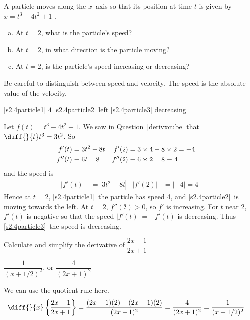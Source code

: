 \begin{Mquestion}[1999H]
A particle moves along the $x$--axis so that its position
 at time $t$ is given by $x=t^3-4t^2+1$ .
\begin{enumerate}[(a)]
\item\label{s2.4particle1}At $t=2$, what is the particle's speed?
\item\label{s2.4particle2}At $t=2$, in what direction is the particle moving?
\item\label{s2.4particle3}At $t=2$, is the particle's speed increasing or decreasing?
\end{enumerate}
\end{Mquestion}
\begin{hint} Be careful to distinguish between speed and velocity. The speed is the absolute value of the velocity.
\end{hint}
\begin{answer}
\eqref{s2.4particle1} $4$\qquad
\eqref{s2.4particle2} left \qquad
\eqref{s2.4particle3} decreasing
\end{answer}
\begin{solution}
Let $f(t)=t^3-4t^2+1$. We saw in Question~\ref{derivxcube} that 
$\diff{}{t}t^3=3t^2$. So
\begin{align*}
f'(t)&=3t^2-8t & f'(2)&=3\times 4-8\times 2=-4\cr
f''(t)&=6t-8 & f''(2)&=6\times 2-8=4
\end{align*}
and the speed is
\begin{align*}
|f'(t)|&=|3t^2-8t| & |f'(2)|&=|-4|=4
\end{align*}
Hence at $t=2$, \eqref{s2.4particle1}~the particle has speed {4}, and \eqref{s2.4particle2}~is
moving {towards the left}.
At $t=2$, $f''(2)>0$, so $f'$ is increasing. For $t$ near $2$, $f'(t)$ is negative so that the speed $|f'(t)|=-f'(t)$ is decreasing. Thus \eqref{s2.4particle3}~the speed is {decreasing}.
\end{solution}


\begin{question}[1999H]
Calculate and simplify the derivative of
$\dfrac{2x-1}{2x+1}$
\end{question}
\begin{answer}
$\dfrac{1}{{(x+1/2)}^2}$, or $\dfrac{4}{(2x+1)^2}$
\end{answer}
\begin{solution}
We can use the quotient rule here.
\begin{align*}
\diff{}{x}\left\{\frac{2x-1}{2x+1}\right\}&=\frac{(2x+1)(2)-(2x-1)(2)}{(2x+1)^2}
=\frac{4}{(2x+1)^2}=\frac{1}{(x+1/2)^2}
\end{align*}
\end{solution}




